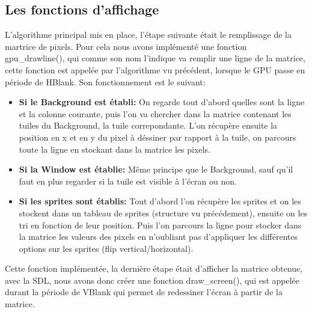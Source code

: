 \documentclass{report}
\begin{document}
\subsection{Les fonctions d'affichage}
L'algorithme principal mis en place, l'étape suivante était le remplissage de la martrice de pixels. Pour cela nous avons implémenté une fonction gpu_drawline(), qui comme son nom l'indique va remplir une ligne de la matrice, cette fonction est appelée par l'algorithme vu précédent, lorsque le GPU passe en période de HBlank. Son fonctionnement est le suivant:\\
\begin{itemize}
\item \textbf{Si le Background est établi:}
	On regarde tout d'abord quelles sont la ligne et la colonne courante, puis l'on va chercher dans la matrice contenant les tuiles du Background, la tuile correpondante. L'on récupère ensuite la position en x et en y du pixel à déssiner par rapport à la tuile, on parcours toute la ligne en stockant dans la matrice les pixels.\\
\item \textbf{Si la Window est établie:}
	Même principe que le Background, sauf qu'il faut en plus regarder si la tuile est visible à l'écran ou non.\\
\item \textbf{Si les sprites sont établis:}
	Tout d'abord l'on récupère les sprites et on les stockent dans un tableau de sprites (structure vu précédement), ensuite on les tri en fonction de leur position. Puis l'on parcours la ligne pour stocker dans la matrice les valeurs des pixels en n'oubliant pas d'appliquer les différentes options sur les sprites (flip vertical/horizontal).\\
\end{itemize}

Cette fonction implémentée, la dernière étape était d'afficher la matrice obtenue, avec la SDL, nous avons donc créer une fonction draw_screen(), qui est appelée durant la période de VBlank qui permet de redessiner l'écran à partir de la matrice.\\
\end{document}
